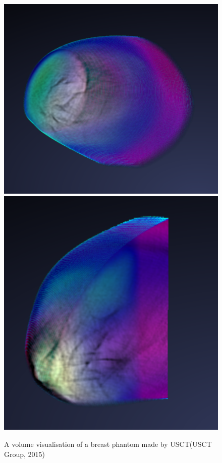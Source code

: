 \documentclass[twoside, english, 11pt]{report}
\begin{document}
\begin{figure}[!h]
\includegraphics[scale=0.4]{img/usct1}\includegraphics[scale=0.4335]{img/usct2}\\
\caption{A volume visualisation of a breast phantom made by USCT(USCT Group, 2015)\label{fig:usct}}
\end{figure}
\end{document}
